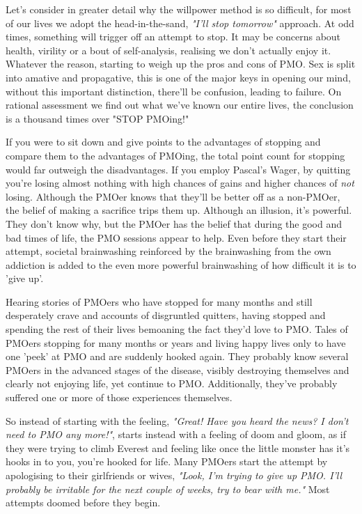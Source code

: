 \documentclass[easypeasy.tex]{subfiles}
\begin{document}
Let's consider in greater detail why the willpower method is so difficult, for most of our lives we adopt the head-in-the-sand, \textit{"I'll stop tomorrow"} approach. At odd times, something will trigger off an attempt to stop. It may be concerns about health, virility or a bout of self-analysis, realising we don't actually enjoy it. Whatever the reason, starting to weigh up the pros and cons of PMO. Sex is split into amative and propagative, this is one of the major keys in opening our mind, without this important distinction, there'll be confusion, leading to failure. On rational assessment we find out what we've known our entire lives, the conclusion is a thousand times over "STOP PMOing!"

If you were to sit down and give points to the advantages of stopping and compare them to the advantages of PMOing, the total point count for stopping would far outweigh the disadvantages. If you employ Pascal's Wager, by quitting you're losing almost nothing with high chances of gains and higher chances of \textit{not} losing. Although the PMOer knows that they'll be better off as a non-PMOer, the belief of making a sacrifice trips them up. Although an illusion, it's powerful. They don't know why, but the PMOer has the belief that during the good and bad times of life, the PMO sessions appear to help. Even before they start their attempt, societal brainwashing reinforced by the brainwashing from the own addiction is added to the even more powerful brainwashing of how difficult it is to 'give up'.

Hearing stories of PMOers who have stopped for many months and still desperately crave and accounts of disgruntled quitters, having stopped and spending the rest of their lives bemoaning the fact they'd love to PMO. Tales of PMOers stopping for many months or years and living happy lives only to have one 'peek' at PMO and are suddenly hooked again. They probably know several PMOers in the advanced stages of the disease, visibly destroying themselves and clearly not enjoying life, yet continue to PMO. Additionally, they've probably suffered one or more of those experiences themselves.

So instead of starting with the feeling, \textit{"Great! Have you heard the news? I don't need to PMO any more!"}, starts instead with a feeling of doom and gloom, as if they were trying to climb Everest and feeling like once the little monster has it's hooks in to you, you're hooked for life. Many PMOers start the attempt by apologising to their girlfriends or wives, \textit{"Look, I'm trying to give up PMO. I'll probably be irritable for the next couple of weeks, try to bear with me."} Most attempts doomed before they begin.
\end{document}
